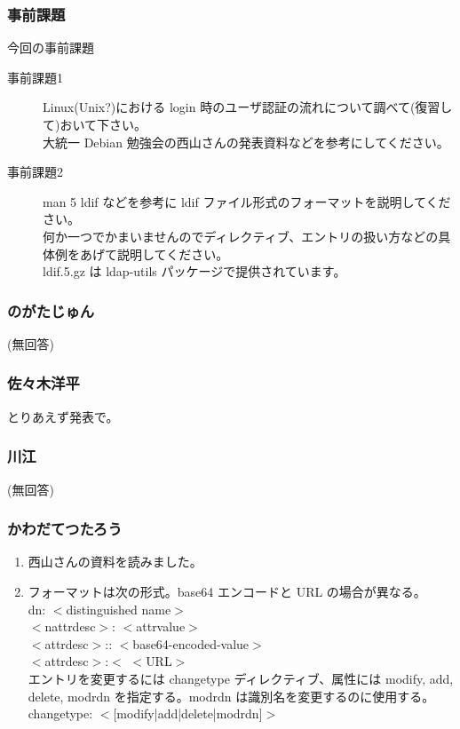 \documentclass[cjk,dvipdfmx,10pt,%
hyperref={bookmarks=true,bookmarksnumbered=true,bookmarksopen=false,%
colorlinks=false,%
pdftitle={第 61 回 関西 Debian 勉強会},%
pdfauthor={倉敷・のがた・かわだ・佐々木},%
pdfsubject={資料},%
}]{beamer}
\begin{document}
\begin{frame}[fragile]
\frametitle{事前課題}

\begin{block}{今回の事前課題}
  \begin{description}
  \item[事前課題1] Linux(Unix?)における login 時のユーザ認証の流れについて調べて(復習して)おいて下さい。\\
    大統一 Debian 勉強会の西山さんの発表資料などを参考にしてください。

  \item[事前課題2] man 5 ldif などを参考に ldif ファイル形式のフォーマットを説明してください。\\
    何か一つでかまいませんのでディレクティブ、エントリの扱い方などの具体例をあげて説明してください。\\
    ldif.5.gz は ldap-utils パッケージで提供されています。
  \end{description}
\end{block}

\end{frame}


\begin{frame}
  \frametitle{ のがたじゅん }
  (無回答)
\end{frame}


\begin{frame}
  \frametitle{ 佐々木洋平 }
  とりあえず発表で。
\end{frame}

\begin{frame}
  \frametitle{ 川江 }
  (無回答)
\end{frame}

\begin{frame}
  \frametitle{ かわだてつたろう }
  \begin{enumerate}
  \item 西山さんの資料を読みました。
  \item フォーマットは次の形式。base64 エンコードと URL の場合が異なる。\\
    dn: $<$distinguished name$>$\\
    $<$nattrdesc$>$: $<$attrvalue$>$\\
    $<$attrdesc$>$:: $<$base64-encoded-value$>$\\
    $<$attrdesc$>$:$<$ $<$URL$>$\\
    
    エントリを変更するには changetype ディレクティブ、属性には modify, add, delete, modrdn を指定する。modrdn は識別名を変更するのに使用する。\\
    changetype: $<$[modify|add|delete|modrdn]$>$
  \end{enumerate}
\end{frame}
\end{document}
